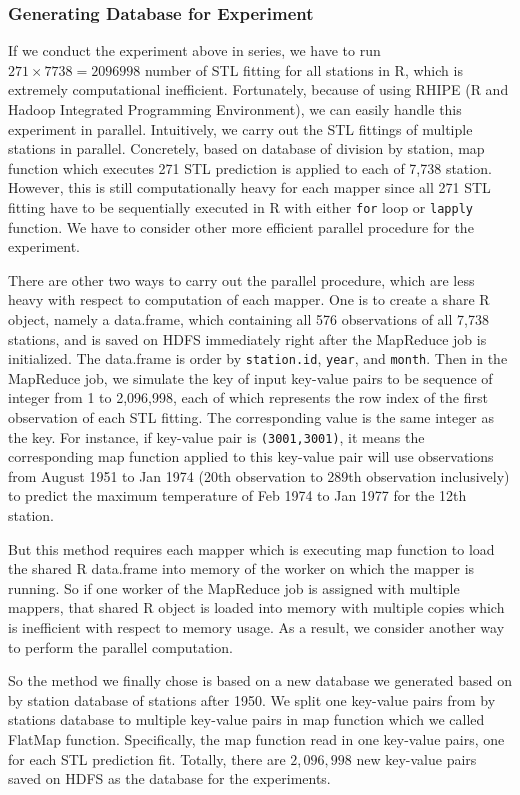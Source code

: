 \subsubsection{Generating Database for Experiment}

If we conduct the experiment above in series, we have to run 
$271 \times 7738 = 2096998$ number of STL fitting for all stations in R, which is 
extremely computational inefficient. Fortunately, because of using RHIPE
(R and Hadoop Integrated Programming Environment), we can easily handle this 
experiment in parallel. Intuitively, we carry out the STL fittings of multiple 
stations in parallel. Concretely, based on database of division by station, map
function which executes 271 STL prediction is applied to each of 7,738 station.
However, this is still computationally heavy for each mapper since all 271 STL 
fitting have to be sequentially executed in R with either \texttt{for} loop or 
\texttt{lapply} function. We have to consider other more efficient parallel 
procedure for the experiment.

There are other two ways to carry out the parallel procedure, which are less 
heavy with respect to computation of each mapper. One is to create a share
R object, namely a data.frame, which containing all 576 observations of all 7,738 
stations, and is saved on HDFS immediately right after the MapReduce job is 
initialized. The data.frame is order by \texttt{station.id}, \texttt{year}, and
\texttt{month}. Then in the MapReduce job, we simulate the key of input key-value
pairs to be sequence of integer from 1 to 2,096,998, each of which represents the
row index of the first observation of each STL fitting. The corresponding value 
is the same integer as the key. For instance, if key-value pair is 
\texttt{(3001,3001)}, it means the corresponding map function applied to this 
key-value pair will use observations from August 1951 to Jan 1974 (20th observation
to 289th observation inclusively) to predict the maximum temperature of Feb 1974
to Jan 1977 for the 12th station.

But this method requires each mapper which is executing map function to load the
shared R data.frame into memory of the worker on which the mapper is running. So
if one worker of the MapReduce job is assigned with multiple mappers, that shared
R object is loaded into memory with multiple copies which is inefficient with
respect to memory usage. As a result, we consider another way to perform the 
parallel computation. 

So the method we finally chose is based on a new database we generated based on 
by station database of stations after 1950. We split one key-value pairs from by 
stations database to multiple key-value pairs in map function which we called 
FlatMap function. Specifically, the map function read in one key-value pairs, one
for each STL prediction fit. Totally, there are $2,096,998$ new key-value pairs 
saved on HDFS as the database for the experiments.

